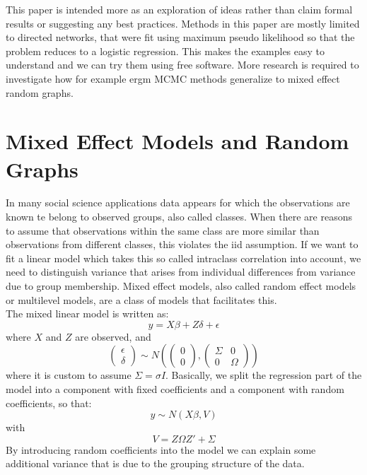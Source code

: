 \documentclass[a4paper]{article}
\begin{document}
This paper is intended more as an exploration of ideas rather than claim formal results or suggesting any best practices. 
Methods in this paper are mostly limited to directed networks, that were fit using maximum pseudo likelihood so that the problem reduces
to a logistic regression. This makes the examples easy to understand and we can try them using free software.
More research is required to investigate how for example ergm MCMC methods generalize to mixed effect random graphs.

\section{Mixed Effect Models and Random Graphs}

In many social science applications data appears for which the observations are known te belong to observed groups, also called classes. 
When there are reasons to assume that observations within the same class are more similar than observations from different classes, this violates the iid assumption.
If we want to fit a linear model which takes this so called intraclass correlation into account, we need to distinguish variance that arises from individual differences 
from variance due to group membership. Mixed effect models, also called random effect models or multilevel models, are a class of models that facilitates this. \\

\noindent The mixed linear model \citep{de2008handbook} is written as:
$$
y = X \beta + Z \delta + \epsilon
$$
where $X$ and $Z$ are observed, and
$$
\left( \begin{array}{c} \epsilon \\ \delta  \end{array} \right) \sim N \left( \left( \begin{array}{c} 0 \\ 0 \end{array} \right), \left( \begin{array}{cc} \Sigma & 0 \\ 0 & \Omega \end{array} \right) \right)
$$
where it is custom to assume $\Sigma = \sigma I$. Basically, we split the regression part of the model into a component with fixed coefficients and a component with random coefficients, so that:
$$
y \sim N (X \beta, V)
$$ 
with
$$
V = Z \Omega Z' + \Sigma
$$
By introducing random coefficients into the model we can explain some additional variance that is due to the grouping structure of the data.\\
\end{document}
